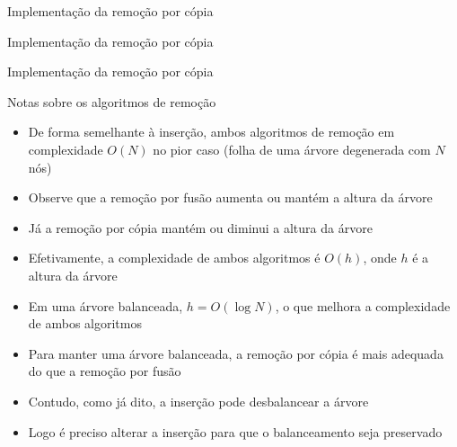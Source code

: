 \begin{frame}[fragile]{Implementação da remoção por cópia}
\end{frame}

\begin{frame}[fragile]{Implementação da remoção por cópia}
\end{frame}

\begin{frame}[fragile]{Implementação da remoção por cópia}
\end{frame}

\begin{frame}[fragile]{Notas sobre os algoritmos de remoção}

    \begin{itemize}
        \item De forma semelhante à inserção, ambos algoritmos de remoção em complexidade 
            $O(N)$ no pior caso (folha de uma árvore degenerada com $N$ nós)

        \item Observe que a remoção por fusão aumenta ou mantém a altura da árvore

        \item Já a remoção por cópia mantém ou diminui a altura da árvore

        \item Efetivamente, a complexidade de ambos algoritmos é $O(h)$, onde $h$ é a altura da
            árvore

        \item Em uma árvore balanceada, $h = O(\log N)$, o que melhora a complexidade de 
            ambos algoritmos

        \item Para manter uma árvore balanceada, a remoção por cópia é mais adequada do que
            a remoção por fusão

        \item Contudo, como já dito, a inserção pode desbalancear a árvore

        \item Logo é preciso alterar a inserção para que o balanceamento seja preservado
    \end{itemize}

\end{frame}
